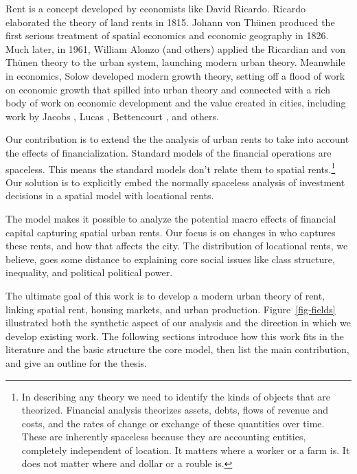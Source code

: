 Rent is a concept developed by economists like David Ricardo.  Ricardo \cite{ricardoEssayInfluenceLow1815} elaborated the theory of land rents in 1815. Johann von Th\"unen \cite{vonthunenIsolirteStaatBeziehung1826} produced the first serious treatment of spatial economics and economic geography in 1826. Much later, in 1961, William Alonzo (and others) \cite{alonsoModelUrbanLand1960} applied the Ricardian and von Th\"unen theory to the urban system, launching modern urban theory. Meanwhile in economics, Solow \cite{solowContributionTheoryEconomic1956} developed modern growth theory, setting off a flood of work on economic growth that spilled into urban theory and connected with a rich body of work on economic development and the value created in cities, including work by Jacobs \cite{jacobsEconomyCities1969}, Lucas \cite{lucasMechanicsEconomicDevelopment1988}, Bettencourt \cite{bettencourtGrowthInnovationScaling2007}, and others. 

Our contribution is to extend the the analysis of urban rents to take into account the effects of financialization. Standard models of the financial operations are spaceless. This means the standard models don't relate them to spatial rents.\footnote{In describing any theory we need to identify the kinds of objects that are theorized. Financial analysis theorizes  assets, debts, flows of revenue and costs, and the rates of change or exchange of these quantities over time. These are inherently spaceless because they are accounting entities, completely independent of location. It matters where a worker or a farm is. It does not matter where and dollar or a rouble is.} Our solution is to explicitly embed the normally spaceless analysis of investment decisions in a spatial model with locational rents.

The model makes it possible to analyze the potential macro effects of financial capital capturing spatial urban rents. Our focus is on changes in who captures these rents, and how that affects the city. The distribution of locational rents, we believe, goes some distance to explaining core social issues like class structure, inequality, and political political power.

The ultimate goal of this work is to develop a modern urban theory of rent, linking spatial rent, housing markets, and urban production. 
Figure~\ref{fig-fields} illustrated both the synthetic aspect of our analysis and the direction in which we develop existing work. The following sections introduce how this work fits in the literature and the basic structure the core model, then list the main contribution, and give an outline for the thesis.

